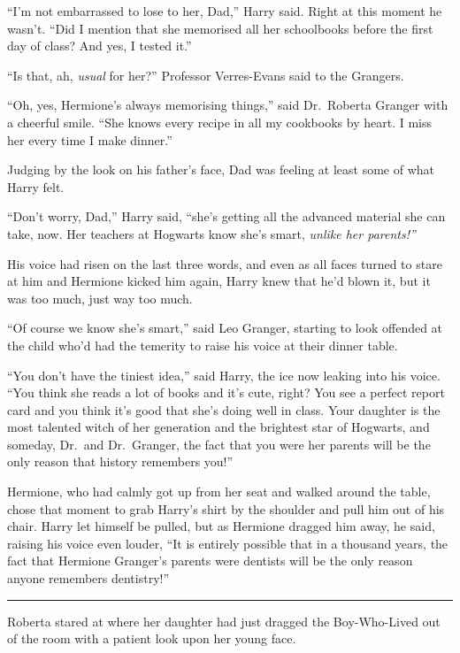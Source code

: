 ``I'm not embarrassed to lose to her, Dad,'' Harry said. Right at this
moment he wasn't. ``Did I mention that she memorised all her schoolbooks
before the first day of class? And yes, I tested it.''

``Is that, ah, \emph{usual} for her?'' Professor Verres-Evans said to
the Grangers.

``Oh, yes, Hermione's always memorising things,'' said Dr.~Roberta
Granger with a cheerful smile. ``She knows every recipe in all my
cookbooks by heart. I miss her every time I make dinner.''

Judging by the look on his father's face, Dad was feeling at least some
of what Harry felt.

``Don't worry, Dad,'' Harry said, ``she's getting all the advanced
material she can take, now. Her teachers at Hogwarts know she's smart,
\emph{unlike her parents!''}

His voice had risen on the last three words, and even as all faces
turned to stare at him and Hermione kicked him again, Harry knew that
he'd blown it, but it was too much, just way too much.

``Of course we know she's smart,'' said Leo Granger, starting to look
offended at the child who'd had the temerity to raise his voice at their
dinner table.

``You don't have the tiniest idea,'' said Harry, the ice now leaking
into his voice. ``You think she reads a lot of books and it's cute,
right? You see a perfect report card and you think it's good that she's
doing well in class. Your daughter is the most talented witch of her
generation and the brightest star of Hogwarts, and someday, Dr.~and
Dr.~Granger, the fact that you were her parents will be the only reason
that history remembers you!''

Hermione, who had calmly got up from her seat and walked around the
table, chose that moment to grab Harry's shirt by the shoulder and pull
him out of his chair. Harry let himself be pulled, but as Hermione
dragged him away, he said, raising his voice even louder, ``It is
entirely possible that in a thousand years, the fact that Hermione
Granger's parents were dentists will be the only reason anyone remembers
dentistry!''

\begin{center}\rule{3in}{0.4pt}\end{center}

Roberta stared at where her daughter had just dragged the Boy-Who-Lived
out of the room with a patient look upon her young face.

